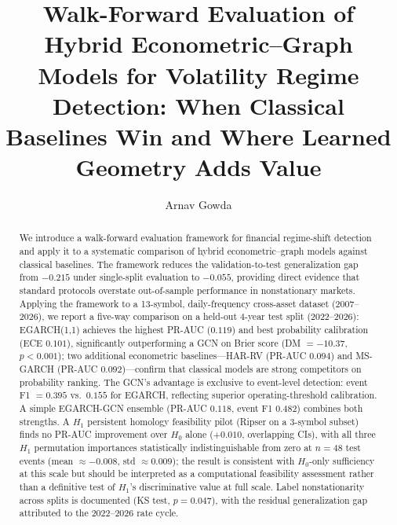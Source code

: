 \documentclass[sigconf]{acmart}
\begin{document}
\title{Walk-Forward Evaluation of Hybrid Econometric--Graph Models for
       Volatility Regime Detection: When Classical Baselines Win and
       Where Learned Geometry Adds Value}

\author{Arnav Gowda}

\begin{abstract}
We introduce a walk-forward evaluation framework for financial regime-shift
detection and apply it to a systematic comparison of hybrid
econometric--graph models against classical baselines.
The framework reduces the validation-to-test generalization gap from
$-0.215$ under single-split evaluation to $-0.055$, providing direct
evidence that standard protocols overstate out-of-sample performance in
nonstationary markets.
Applying the framework to a 13-symbol, daily-frequency cross-asset dataset
(2007--2026), we report a five-way comparison on a held-out 4-year test split
(2022--2026): EGARCH(1,1) achieves the highest PR-AUC ($0.119$) and best
probability calibration (ECE $0.101$), significantly outperforming a GCN on
Brier score (DM $= {-}10.37$, $p{<}0.001$); two additional econometric
baselines---HAR-RV (PR-AUC $0.094$) and MS-GARCH (PR-AUC $0.092$)---confirm
that classical models are strong competitors on probability ranking.
The GCN's advantage is exclusive to event-level detection: event F1 $= 0.395$
vs.\ $0.155$ for EGARCH, reflecting superior operating-threshold calibration.
A simple EGARCH-GCN ensemble (PR-AUC $0.118$, event F1 $0.482$) combines
both strengths.
A $H_1$ persistent homology feasibility pilot (Ripser on a 3-symbol subset)
finds no PR-AUC improvement over $H_0$ alone ($+0.010$, overlapping CIs),
with all three $H_1$ permutation importances statistically indistinguishable
from zero at $n{=}48$ test events (mean ${\approx}{-}0.008$, std ${\approx}0.009$);
the result is consistent with $H_0$-only sufficiency at this scale but should
be interpreted as a computational feasibility assessment rather than a
definitive test of $H_1$'s discriminative value at full scale.
Label nonstationarity across splits is documented (KS test, $p{=}0.047$),
with the residual generalization gap attributed to the 2022--2026 rate cycle.
\end{abstract}
\end{document}
